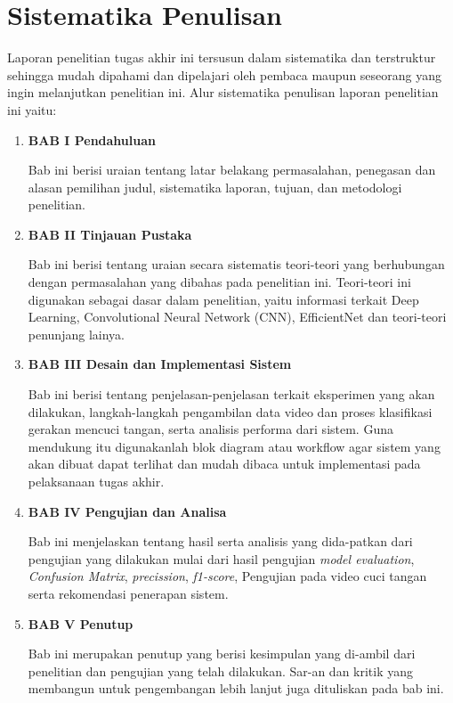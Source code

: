 \newpage
\section{Sistematika Penulisan}
\label{sec:sistematikapenulisan}

Laporan penelitian tugas akhir ini tersusun dalam sistematika dan terstruktur sehingga mudah dipahami dan dipelajari oleh pembaca maupun seseorang yang ingin melanjutkan penelitian ini. Alur sistematika penulisan laporan penelitian ini yaitu:

\begin{enumerate}[nolistsep]

  \item \textbf{BAB I Pendahuluan}

  Bab ini berisi uraian tentang latar belakang permasalahan, penegasan dan alasan pemilihan judul, sistematika laporan, tujuan, dan metodologi penelitian.
  
  \vspace{2ex}

  \item \textbf{BAB II Tinjauan Pustaka}

  Bab ini berisi tentang uraian secara sistematis teori-teori yang berhubungan dengan permasalahan yang dibahas pada penelitian ini. Teori-teori ini digunakan sebagai dasar dalam penelitian, yaitu informasi terkait Deep Learning, Convolutional Neural Network (CNN), EfficientNet dan teori-teori penunjang lainya.

  \vspace{2ex}

  \item \textbf{BAB III Desain dan Implementasi Sistem}

  Bab ini berisi tentang penjelasan-penjelasan terkait eksperimen yang akan dilakukan, langkah-langkah pengambilan data video dan proses klasifikasi gerakan mencuci tangan, serta analisis performa dari sistem. Guna mendukung itu digunakanlah blok diagram atau workﬂow agar sistem yang akan dibuat dapat terlihat dan mudah dibaca untuk implementasi pada pelaksanaan tugas akhir.

  \vspace{2ex}

  \item \textbf{BAB IV Pengujian dan Analisa}

  Bab ini menjelaskan tentang hasil serta analisis yang dida-patkan dari pengujian yang dilakukan mulai dari hasil pengujian \emph{model evaluation}, \textit{Confusion Matrix}, \textit{precission}, \textit{f1-score}, Pengujian pada video cuci tangan serta rekomendasi penerapan sistem.

  \vspace{2ex}

  \item \textbf{BAB V Penutup}

  Bab ini merupakan penutup yang berisi kesimpulan yang di-ambil dari penelitian dan pengujian yang telah dilakukan. Sar-an dan kritik yang membangun untuk pengembangan lebih lanjut juga dituliskan pada bab ini.

\end{enumerate}
